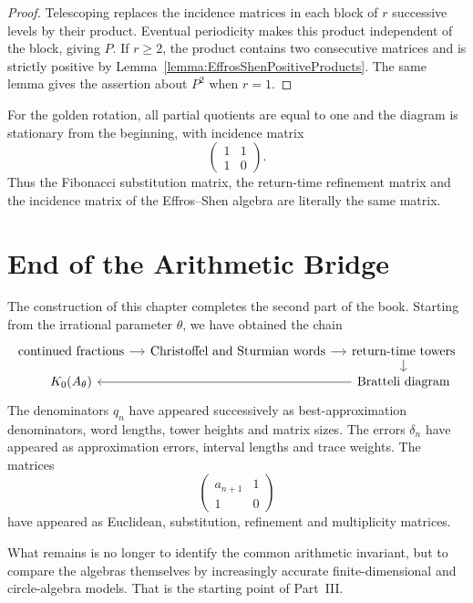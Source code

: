 \documentclass{book}
\begin{document}
\begin{proof}
  Telescoping replaces the incidence matrices in each block of \(r\)
  successive levels by their product.  Eventual periodicity makes this
  product independent of the block, giving \(P\).  If \(r\geq2\), the
  product contains two consecutive matrices and is strictly positive by
  Lemma~\ref{lemma:EffrosShenPositiveProducts}.  The same lemma gives the
  assertion about \(P^2\) when \(r=1\).
\end{proof}

For the golden rotation, all partial quotients are equal to one and the
diagram is stationary from the beginning, with incidence matrix
\[
  \begin{pmatrix}1&1\\1&0\end{pmatrix}.
\]
Thus the Fibonacci substitution matrix, the return-time refinement matrix
and the incidence matrix of the Effros--Shen algebra are literally the same
matrix.

\section{End of the Arithmetic Bridge}

The construction of this chapter completes the second part of the book.
Starting from the irrational parameter \(\theta\), we have obtained the
chain
\[
  \begin{tikzcd}[column sep=small,row sep=small]
    \text{continued fractions}
      \arrow[r]&
    \text{Christoffel and Sturmian words}
      \arrow[r]&
    \text{return-time towers}
      \arrow[d]\\
    K_0(A_\theta)
      &&
    \text{Bratteli diagram}
      \arrow[ll]
  \end{tikzcd}
\]
The denominators \(q_n\) have appeared successively as best-approximation
denominators, word lengths, tower heights and matrix sizes.  The errors
\(\delta_n\) have appeared as approximation errors, interval lengths and
trace weights.  The matrices
\[
  \begin{pmatrix}a_{n+1}&1\\1&0\end{pmatrix}
\]
have appeared as Euclidean, substitution, refinement and multiplicity
matrices.

What remains is no longer to identify the common arithmetic invariant, but
to compare the algebras themselves by increasingly accurate
finite-dimensional and circle-algebra models.  That is the starting point
of Part~III.
\end{document}
